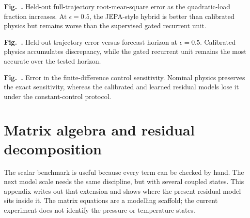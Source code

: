 \documentclass[10pt,journal]{IEEEtran}
\begin{document}
\begin{center}
\label{fig:summary}

\par\smallskip
\parbox{0.80\textwidth}{\textbf{Fig.~\thefigure.} Held-out full-trajectory root-mean-square error as the quadratic-load fraction increases. At $\epsilon=0.5$, the JEPA-style hybrid is better than calibrated physics but remains worse than the supervised gated recurrent unit.}

\par\medskip
{}\label{fig:horizon}

\par\smallskip
\parbox{0.80\textwidth}{\textbf{Fig.~\thefigure.} Held-out trajectory error versus forecast horizon at $\epsilon=0.5$. Calibrated physics accumulates discrepancy, while the gated recurrent unit remains the most accurate over the tested horizon.}

\par\medskip
{}\label{fig:sensitivity}

\par\smallskip
\parbox{0.80\textwidth}{\textbf{Fig.~\thefigure.} Error in the finite-difference control sensitivity. Nominal physics preserves the exact sensitivity, whereas the calibrated and learned residual models lose it under the constant-control protocol.}
\end{center}

\section{Matrix algebra and residual decomposition}\label{app:matrix}
The scalar benchmark is useful because every term can be checked by hand. The next model scale needs the same discipline, but with several coupled states. This appendix writes out that extension and shows where the present residual model sits inside it. The matrix equations are a modelling scaffold; the current experiment does not identify the pressure or temperature states.
\end{document}
